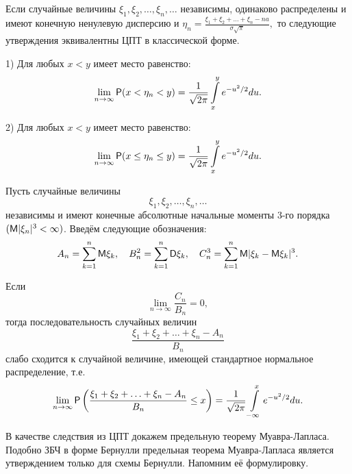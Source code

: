 \begin{consq}
Если случайные величины $\xi_1 , \xi_2 , \ldots , \xi_n , \ldots$ независимы, одинаково распределены и имеют конечную ненулевую дисперсию и
$\eta_n =\frac{\xi_1+\xi_2+\ldots+\xi_n-na}{\sigma\sqrt{\pi}},$
то следующие утверждения эквивалентны ЦПТ в классической форме.

1) Для любых $x < y$ имеет место равенство:
$$
\lim\limits_{n\to\infty} \P(x<\eta_n<y)=
\frac{1}{\sqrt{2\pi}}\int\limits_{x}^y e^{-u^2/2} du.
$$

2) Для любых $x < y$ имеет место равенство:
$$
\lim\limits_{n\to\infty} \P(x \leq \eta_n \leq y)=
\frac{1}{\sqrt{2\pi}}\int\limits_x^y e^{-u^2/2} du.
$$

\end{consq}

\begin{theorem}
Пусть случайные величины $$\xi_1 , \xi_2 , \ldots , \xi_n , \ldots$$ независимы и имеют конечные абсолютные начальные моменты 3-го порядка $(\M|\xi_n|^3 < \infty)$. Введём следующие обозначения:
$$
A_n=\sum\limits_{k=1}^n \M\xi_k,
\quad
B_n^2=\sum\limits_{k=1}^n \D\xi_k,
\quad
C_n^3=\sum\limits_{k=1}^n \M|\xi_k-\M\xi_k|^3.
$$

Если
$$
\lim\limits_{n\to\infty}\frac{C_n}{B_n}=0,
$$
тогда последовательность случайных величин
$$
\frac{\xi_1+\xi_2+\ldots+\xi_n-A_n}{B_n}
$$
слабо сходится к случайной величине, имеющей стандартное нормальное
распределение, т.е.
$$
\lim\limits_{n\to\infty} \P\left(\frac{\xi_1+\xi_2+\ldots+\xi_n-A_n}{B_n} \leq x\right)=
\frac{1}{\sqrt{2\pi}}\int\limits_{-\infty}^x e^{-u^2/2} du.
$$
\end{theorem}

В качестве следствия из ЦПТ докажем предельную теорему Муавра-Лапласа. Подобно ЗБЧ в форме Бернулли предельная теорема Муавра-Лапласа является утверждением только для схемы Бернулли. Напомним её формулировку.

